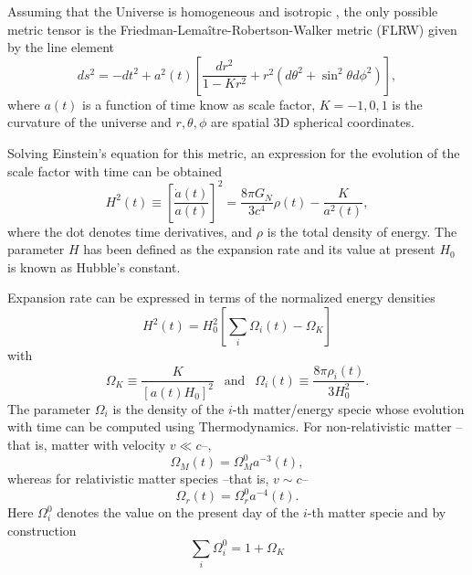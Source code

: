 Assuming that the Universe is homogeneous and isotropic \citep{2014MNRAS.440...10A,2015MNRAS.449..670A}, the only possible metric tensor is the Friedman-Lema\^itre-Robertson-Walker metric (FLRW) given by the line element \cite{1927ASSB...47...49L}
\begin{equation}
ds^2 = -dt^2+a^2(t)\left[\frac{dr^2}{1-Kr^2}+r^2(d\theta^2+\sin^2\theta d\phi^2)\right],
\end{equation}
where $a(t)$ is a function of time know as scale factor, $K=-1,0,1$ is the curvature of the universe and $r,\theta,\phi$ are spatial 3D spherical coordinates.
\newline

Solving Einstein's equation for this metric, an expression for the evolution of the scale factor with time can be obtained
\begin{equation}
H^2(t)\equiv \left[\frac{\dot a(t)}{a(t)}\right]^2 = \frac{8\pi G_N}{3c^4}\rho(t) -\frac{K}{a^2(t)},
\end{equation}
where the dot denotes time derivatives, and $\rho$ is the total density of energy. The parameter $H$ has been defined as the expansion rate and its value at present $H_0$ is known as Hubble's constant.
\newline

Expansion rate can be expressed in terms of the normalized energy densities
\begin{equation}
H^2(t) = H_0^2\left[\sum_i\Omega_i(t)-\Omega_K\right]
\label{eq:flrw}
\end{equation}
with
\begin{equation}
\Omega_K\equiv\frac{K}{[a(t)H_0]^2}\ \ \mbox{ and }\ \ \Omega_i(t)\equiv \frac{8\pi\rho_i(t)}{3H_0^2}.
\end{equation}
The parameter $\Omega_i$ is the density of the $i$-th matter/energy specie whose evolution with time can be computed using Thermodynamics. For non-relativistic matter --that is, matter with velocity $v\ll c$--, 
\begin{equation}
\Omega_M(t) = \Omega_M^0a^{-3}(t),
\end{equation}
whereas for relativistic matter species --that is, $v\sim c$--
\begin{equation}
\Omega_r(t) = \Omega_r^0 a^{-4}(t).
\end{equation}
Here $\Omega_i^0$ denotes the value on the present day of the $i$-th matter specie and by construction
\begin{equation}
\sum_i\Omega_i^0=1+\Omega_K
\label{eq:conservationenergy}
\end{equation}
\newline


